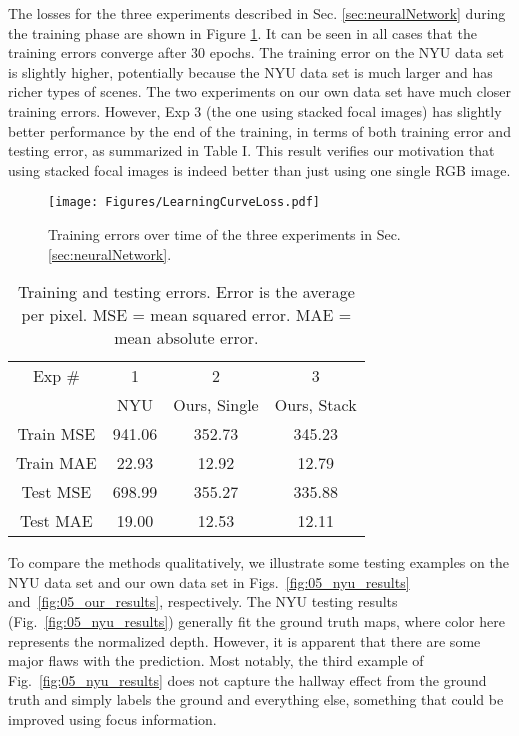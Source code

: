 \documentclass[letterpaper, 10 pt, conference]{ieeeconf}  %
\begin{document}
The losses for the three experiments described in Sec. \ref{sec:neuralNetwork} during the training phase are shown in Figure \ref{fig:LearningCurveLoss}. It can be seen in all cases that the training errors converge after 30 epochs. The training error on the NYU data set is slightly higher, potentially because the NYU data set is much larger and has richer types of scenes. The two experiments on our own data set have much closer training errors. However, Exp 3 (the one using stacked focal images) has slightly better performance by the end of the training, in terms of both training error and testing error, as summarized in Table I. This result verifies our motivation that using stacked focal images is indeed better than just using one single RGB image. 

\begin{figure}[h]
\centering
        \texttt{[image: Figures/LearningCurveLoss.pdf]}
        \caption{Training errors over time of the three experiments in Sec. \ref{sec:neuralNetwork}.}
\label{fig:LearningCurveLoss}
\end{figure}\begin{table}
\label{tab:trainTestError}
\begin{center}
\begin{tabular}{|c|c|c|c|}
\hline 
Exp \#  &  1   &  2  & 3\\ 
  &  NYU   &  Ours, Single  & Ours, Stack\\ 
\hline
Train MSE &  941.06  &  352.73  & 345.23   \\
\hline
Train MAE &  22.93  &  12.92  & 12.79   \\
\hline
Test MSE &  698.99  &  355.27  & 335.88   \\
\hline
Test MAE &  19.00  &  12.53  & 12.11   \\
\hline
\end{tabular}
\end{center}
\caption{Training and testing errors. Error is the average per pixel. MSE = mean squared error. MAE = mean absolute error.}
\end{table}

To compare the methods qualitatively, we illustrate some testing examples on the NYU data set and our own data set in Figs.~\ref{fig:05_nyu_results} and~\ref{fig:05_our_results}, respectively. The NYU testing results (Fig.~\ref{fig:05_nyu_results}) generally fit the ground truth maps, where color here represents the normalized depth. However, it is apparent that there are some major flaws with the prediction. Most notably, the third example of Fig.~\ref{fig:05_nyu_results} does not capture the hallway effect from the ground truth and simply labels the ground and everything else, something that could be improved using focus information. 
\end{document}
